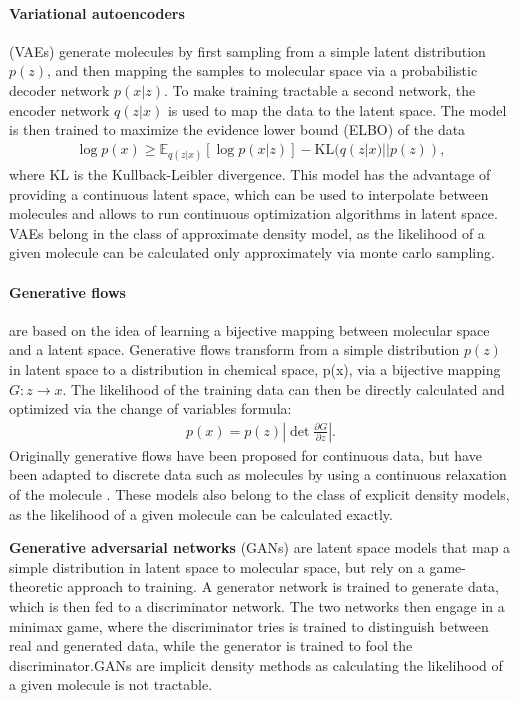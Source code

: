 \paragraph{Variational autoencoders} (VAEs) \citep{kingmaAutoEncodingVariationalBayes2013} generate molecules by first
sampling from a simple latent distribution $p(z)$, and then mapping the samples to molecular space
via a probabilistic decoder network $p(x|z)$. To make training tractable a second network, the
encoder network $q(z|x)$ is used to map the data to the latent space. The model is then trained to
maximize the evidence lower bound (ELBO) of the data
\begin{align}
    \log p(x) \geq \mathbb{E}_{q(z|x)}[\log p(x|z)] - \text{KL}(q(z|x) || p(z)),
\end{align}
where KL is the Kullback-Leibler divergence. This model has the advantage of providing a continuous
latent space, which can be used to interpolate between molecules and allows to run continuous
optimization algorithms in latent space. VAEs belong in the class of approximate density model, as
the likelihood of a given molecule can be calculated only approximately via monte carlo sampling.

\paragraph{Generative flows} \citep{rezendeVariationalInferenceNormalizing2016} are based on the idea of learning a bijective mapping between molecular
space and a latent space. Generative flows transform from a simple distribution $p(z)$ in latent space
to a distribution in chemical space, p(x), via a bijective mapping $G: z \rightarrow x$.
The likelihood of the training data can then be directly calculated and optimized
via the change of variables formula:
\begin{align}
    p(x) = p(z) \left| \det \frac{\partial G}{\partial z} \right|.
\end{align}
Originally generative flows have been proposed for continuous data, but have been adapted to
discrete data such as molecules by using a continuous relaxation of the molecule
\citep{madhawaGraphNVPInvertibleFlow2019}. These models also belong to the class of explicit density
models, as the likelihood of a given molecule can be calculated exactly.

\textbf{Generative adversarial networks} (GANs) \citep{goodfellowGenerativeAdversarialNetworks2014}
are latent space models that map a simple distribution in latent space to molecular space, but rely
on a game-theoretic approach to training. A generator network is trained to generate data, which is
then fed to a discriminator network. The two networks then engage in a minimax game, where the
discriminator tries is trained to distinguish between real and generated data, while the generator
is trained to fool the discriminator.\@ \acp{GAN} are implicit density methods as calculating the
likelihood of a given molecule is not tractable.


